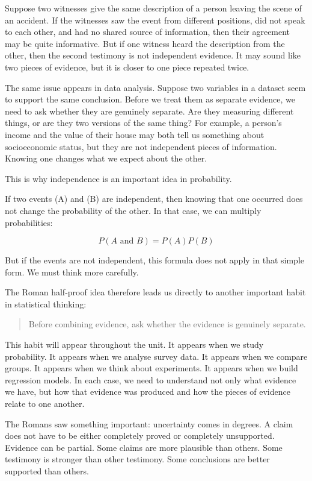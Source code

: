 \documentclass[
  letterpaper,
  DIV=11,
  numbers=noendperiod]{scrreprt}
\begin{document}
Suppose two witnesses give the same description of a person leaving the
scene of an accident. If the witnesses saw the event from different
positions, did not speak to each other, and had no shared source of
information, then their agreement may be quite informative. But if one
witness heard the description from the other, then the second testimony
is not independent evidence. It may sound like two pieces of evidence,
but it is closer to one piece repeated twice.

The same issue appears in data analysis. Suppose two variables in a
dataset seem to support the same conclusion. Before we treat them as
separate evidence, we need to ask whether they are genuinely separate.
Are they measuring different things, or are they two versions of the
same thing? For example, a person's income and the value of their house
may both tell us something about socioeconomic status, but they are not
independent pieces of information. Knowing one changes what we expect
about the other.

This is why independence is an important idea in probability.

If two events (A) and (B) are independent, then knowing that one
occurred does not change the probability of the other. In that case, we
can multiply probabilities:

\[P(A \text{ and } B) = P(A)P(B)\]

But if the events are not independent, this formula does not apply in
that simple form. We must think more carefully.

The Roman half-proof idea therefore leads us directly to another
important habit in statistical thinking:

\begin{quote}
Before combining evidence, ask whether the evidence is genuinely
separate.
\end{quote}

This habit will appear throughout the unit. It appears when we study
probability. It appears when we analyse survey data. It appears when we
compare groups. It appears when we think about experiments. It appears
when we build regression models. In each case, we need to understand not
only what evidence we have, but how that evidence was produced and how
the pieces of evidence relate to one another.

The Romans saw something important: uncertainty comes in degrees. A
claim does not have to be either completely proved or completely
unsupported. Evidence can be partial. Some claims are more plausible
than others. Some testimony is stronger than other testimony. Some
conclusions are better supported than others.
\end{document}
